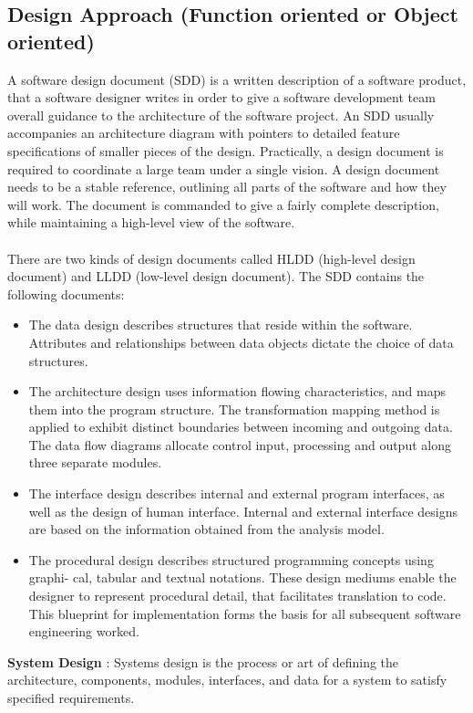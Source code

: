 \subsection{  Design Approach (Function oriented or Object oriented)}
A software design document (SDD) is a written description of a software product, that
a software designer writes in order to give a software development team overall guidance
to the architecture of the software project. An SDD usually accompanies an architecture
diagram with pointers to detailed feature specifications of smaller pieces of the design.
Practically, a design document is required to coordinate a large team under a single vision.
A design document needs to be a stable reference, outlining all parts of the software and
how they will work. The document is commanded to give a fairly complete description,
while maintaining a high-level view of the software.\\\\
There are two kinds of design documents called HLDD (high-level design document)
and LLDD (low-level design document). The SDD contains the following documents:\\
\begin{itemize}
\item The data design describes structures that reside within the software. Attributes and
relationships between data objects dictate the choice of data structures.
\item The architecture design uses information flowing characteristics, and maps them into
the program structure. The transformation mapping method is applied to exhibit
distinct boundaries between incoming and outgoing data. The data flow diagrams
allocate control input, processing and output along three separate modules.
\item The interface design describes internal and external program interfaces, as well as
the design of human interface. Internal and external interface designs are based on
the information obtained from the analysis model.
\item The procedural design describes structured programming concepts using graphi-
cal, tabular and textual notations. These design mediums enable the designer to
represent procedural detail, that facilitates translation to code. This blueprint for
implementation forms the basis for all subsequent software engineering worked.
\end{itemize}
\textbf{System Design} : Systems design is the process or art of defining the architecture,
components, modules, interfaces, and data for a system to satisfy specified requirements.
